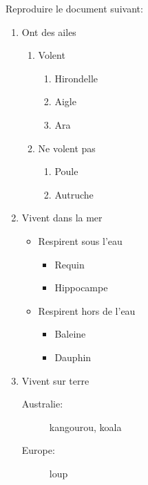 \documentclass[10pt,a4paper]{scrartcl}
\begin{document}
Reproduire le document suivant:
\begin{enumerate}
\item Ont des ailes
	\begin{enumerate}
		\item Volent
		\begin{enumerate}
			\item Hirondelle
			\item Aigle
			\item Ara
		\end{enumerate}
		\item Ne volent pas
		\begin{enumerate}
			\item Poule
			\item Autruche
		\end{enumerate}
	\end{enumerate}
\item Vivent dans la mer
	\begin{itemize}
		\item Respirent sous l'eau
		\begin{itemize}
			\item Requin
			\item Hippocampe
		\end{itemize}
		\item Respirent hors de l'eau
		\begin{itemize}
			\item Baleine
			\item Dauphin
		\end{itemize}
	\end{itemize}
\item Vivent sur terre
	\begin{description}
		\item[Australie:] kangourou, koala
		\item[Europe:] loup
	\end{description}
\end{enumerate}
\end{document}
